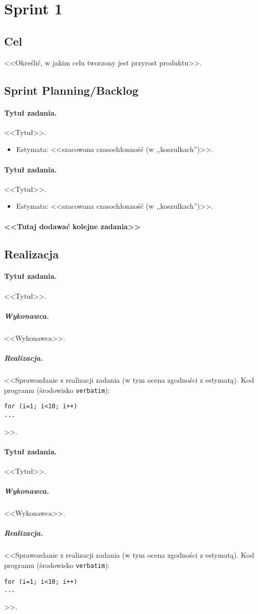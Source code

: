 \documentclass[a4paper]{article}
\begin{document}
\section{Sprint 1}
\subsection{Cel} <<Określić, w jakim celu tworzony jest przyrost produktu>>.
\subsection{Sprint Planning/Backlog}

\paragraph{Tytuł zadania.} <<Tytuł>>.
\begin{itemize}
\item Estymata: <<szacowana czasochłonność (w ,,koszulkach'')>>.
\end{itemize}

\paragraph{Tytuł zadania.} <<Tytuł>>.
\begin{itemize}
\item Estymata: <<szacowana czasochłonność (w ,,koszulkach'')>>.
\end{itemize}

\paragraph{<<Tutaj dodawać kolejne zadania>>}

\subsection{Realizacja}

\paragraph{Tytuł zadania.} <<Tytuł>>.
\subparagraph{Wykonawca.} <<Wykonawca>>.
\subparagraph{Realizacja.} <<Sprawozdanie z realizacji zadania (w tym ocena zgodności z estymatą). Kod programu (środowisko \texttt{verbatim}): \begin{verbatim}
for (i=1; i<10; i++)
...
\end{verbatim}>>.

\paragraph{Tytuł zadania.} <<Tytuł>>.
\subparagraph{Wykonawca.} <<Wykonawca>>.
\subparagraph{Realizacja.} <<Sprawozdanie z realizacji zadania (w tym ocena zgodności z estymatą). Kod programu (środowisko \texttt{verbatim}): \begin{verbatim}
for (i=1; i<10; i++)
...
\end{verbatim}>>.
\end{document}
